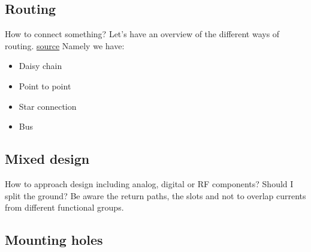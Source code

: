 \documentclass[final]{cubedoc}
\begin{document}
	\subsection{Routing}
	
	How to connect something? Let's have an overview of the different ways of routing. \href{https://resources.pcb.cadence.com/blog/pcb-routing-topologies-demystified}{source} Namely we have:
	
	\begin{itemize}
		\item Daisy chain
		\item Point to point
		\item Star connection
		\item Bus
	\end{itemize}
	
	\subsection{Mixed design}
	
	
	How to approach design including analog, digital or RF components? Should I split the ground? Be aware the return paths, the slots and not to overlap currents from different functional groups.
	
	
	
	\subsection{Mounting holes}
	
	
	
\end{document}
